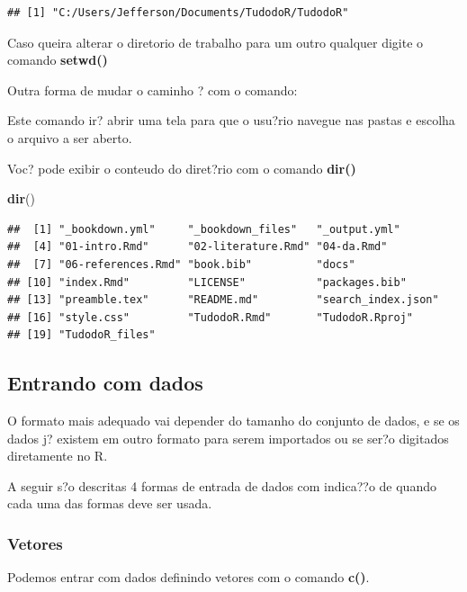 \documentclass[]{book}
\newenvironment{Shaded}{\begin{snugshade}}{\end{snugshade}}
\newcommand{\KeywordTok}[1]{\textcolor[rgb]{0.13,0.29,0.53}{\textbf{#1}}}
\newcommand{\NormalTok}[1]{#1}
\begin{document}
\begin{verbatim}
## [1] "C:/Users/Jefferson/Documents/TudodoR/TudodoR"
\end{verbatim}

Caso queira alterar o diretorio de trabalho para um outro qualquer digite o comando \textbf{setwd()}

Outra forma de mudar o caminho ? com o comando:

Este comando ir? abrir uma tela para que o usu?rio navegue nas pastas e escolha o arquivo a ser aberto.

Voc? pode exibir o conteudo do diret?rio com o comando \textbf{dir()}

\begin{Shaded}
\begin{Highlighting}[]
\KeywordTok{dir}\NormalTok{()}
\end{Highlighting}
\end{Shaded}

\begin{verbatim}
##  [1] "_bookdown.yml"     "_bookdown_files"   "_output.yml"      
##  [4] "01-intro.Rmd"      "02-literature.Rmd" "04-da.Rmd"        
##  [7] "06-references.Rmd" "book.bib"          "docs"             
## [10] "index.Rmd"         "LICENSE"           "packages.bib"     
## [13] "preamble.tex"      "README.md"         "search_index.json"
## [16] "style.css"         "TudodoR.Rmd"       "TudodoR.Rproj"    
## [19] "TudodoR_files"
\end{verbatim}

\hypertarget{entrando-com-dados}{%
\subsection{Entrando com dados}\label{entrando-com-dados}}

O formato mais adequado vai depender do tamanho do conjunto de dados, e se os dados j? existem em outro formato para serem importados ou se ser?o digitados diretamente no R.

A seguir s?o descritas 4 formas de entrada de dados com indica??o de quando cada uma das formas deve ser usada.

\hypertarget{vetores}{%
\subsubsection{Vetores}\label{vetores}}

Podemos entrar com dados definindo vetores com o comando \textbf{c()}.
\end{document}
